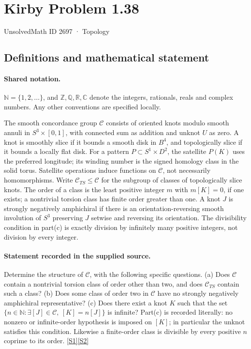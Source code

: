 \documentclass[11pt]{article}
\newcommand{\sref}[2]{\hyperlink{source:#1:#2}{[S#2]}}
\begin{document}
\setcounter{section}{2696}
\section{Kirby Problem 1.38}\label{2697}
{\small\sffamily UnsolvedMath ID 2697 · Topology}
\subsection{Definitions and mathematical statement}

\paragraph{Shared notation.}$\mathbb N=\{1,2,\ldots\}$, and $\mathbb Z,\mathbb Q,\mathbb R,\mathbb C$ denote the integers, rationals, reals and complex numbers. Any other conventions are specified locally.


The smooth concordance group $\mathcal C$ consists of oriented knots modulo smooth annuli in $S^3\times[0,1]$, with connected sum as addition and unknot $U$ as zero. A knot is smoothly slice if it bounds a smooth disk in $B^4$, and topologically slice if it bounds a locally flat disk. For a pattern $P\subset S^1\times D^2$, the satellite $P(K)$ uses the preferred longitude; its winding number is the signed homology class in the solid torus. Satellite operations induce functions on $\mathcal C$, not necessarily homomorphisms. Write $\mathcal C_{TS}\leq\mathcal C$ for the subgroup of classes of topologically slice knots. The order of a class is the least positive integer $m$ with $m[K]=0$, if one exists; a nontrivial torsion class has finite order greater than one. A knot $J$ is strongly negatively amphichiral if there is an orientation-reversing smooth involution of $S^3$ preserving $J$ setwise and reversing its orientation. The divisibility condition in part(c) is exactly division by infinitely many positive integers, not division by every integer.
\paragraph{Statement recorded in the supplied source.}
Determine the structure of $\mathcal C$, with the following specific questions. (a) Does $\mathcal C$ contain a nontrivial torsion class of order other than two, and does $\mathcal C_{TS}$ contain such a class? (b) Does some class of order two in $\mathcal C$ have no strongly negatively amphichiral representative? (c) Does there exist a knot $K$ such that the set $\{n\in\mathbb N:\exists[J]\in\mathcal C,\ [K]=n[J]\}$ is infinite? Part(c) is recorded literally: no nonzero or infinite-order hypothesis is imposed on $[K]$; in particular the unknot satisfies this condition. Likewise a finite-order class is divisible by every positive $n$ coprime to its order. \sref{2697}{1}\sref{2697}{2}
\end{document}
